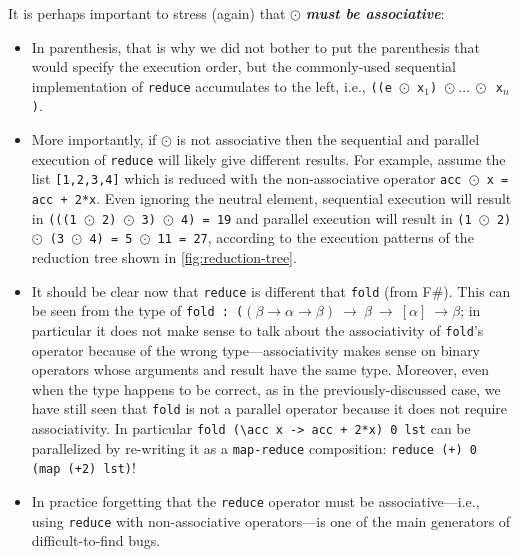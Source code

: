 \documentclass[acmsmall,review]{acmart}\settopmatter{printfolios=true,printccs=false,printacmref=false}
\begin{document}
It is perhaps important to stress (again) that $\odot$ \emph{\bf must be 
associative}:
\begin{itemize}
    \item In parenthesis, that is why we did not bother to put 
the parenthesis that would specify the execution order, 
but the commonly-used sequential implementation of \lstinline{reduce} 
accumulates to the left, i.e., 
{\tt ((e $\odot$ x$_1$) $\odot~\ldots~\odot$ x$_n$)}.

    \item More importantly, if $\odot$ is not associative then the 
    sequential and parallel execution of \lstinline{reduce} will likely
    give different results. For example,  assume the list \lstinline{[1,2,3,4]}
    which is reduced with the non-associative operator {\tt acc $\odot$ x = acc + 2*x}.
    Even ignoring the neutral element, sequential execution will 
    result in {\tt (((1 $\odot$ 2) $\odot$ 3) $\odot$ 4) = 19}
    and parallel execution will result in 
    {\tt (1 $\odot$ 2) $\odot$ (3 $\odot$ 4) = 5 $\odot$ 11 = 27},
    according to the execution patterns of the reduction tree shown
    in \cref{fig:reduction-tree}.
    
    \item It should be clear now that \lstinline{reduce} is different
        that \lstinline{fold} (from F\#). This can be seen from
        the type of {\tt fold : ($(\beta \rightarrow \alpha \rightarrow \beta) ~\rightarrow~ \beta ~\rightarrow~ [\alpha]~ \rightarrow \beta$}; in particular it does not make sense
        to talk about the associativity of \lstinline{fold}'s operator
        because of the wrong type---associativity makes sense on
        binary operators whose arguments and result have the same type.
        Moreover, even when the type happens to be correct, as in the
        previously-discussed case, we have still seen that \lstinline{fold} 
        is not a parallel operator because it does not require associativity.
        In particular \lstinline{fold (\acc x -> acc + 2*x) 0 lst}
        can be parallelized by re-writing it as a \lstinline{map-reduce} 
        composition: \lstinline{reduce (+) 0 (map (+2) lst)}!

    \item In practice forgetting that the \lstinline{reduce} operator
             must be associative---i.e., using \lstinline{reduce} with
             non-associative operators---is one of the main generators 
             of difficult-to-find bugs.
\end{itemize}
\end{document}
